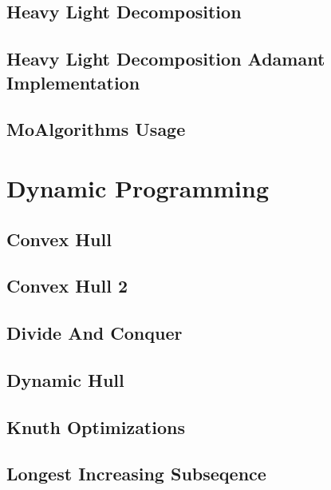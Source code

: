 \subsection{Heavy Light Decomposition}
\raggedbottom
\hrulefill
\subsection{Heavy Light Decomposition Adamant Implementation}
\raggedbottom
\hrulefill
\subsection{MoAlgorithms Usage}
\raggedbottom
\hrulefill

\section{Dynamic Programming}
\subsection{Convex Hull}
\raggedbottom
\hrulefill
\subsection{Convex Hull 2}
\raggedbottom
\hrulefill
\subsection{Divide And Conquer}
\raggedbottom
\hrulefill
\subsection{Dynamic Hull}
\raggedbottom
\hrulefill
\subsection{Knuth Optimizations}
\raggedbottom
\hrulefill
\subsection{Longest	Increasing Subseqence}
\raggedbottom
\hrulefill

